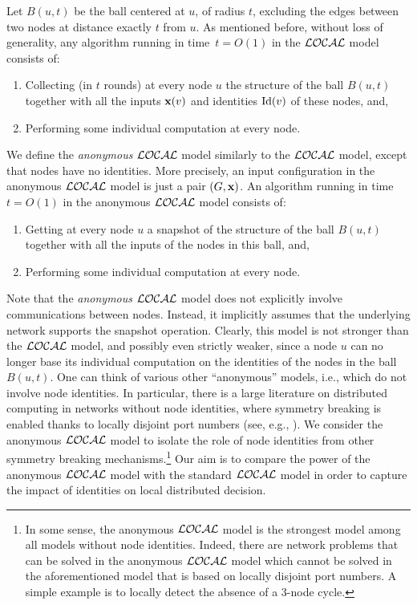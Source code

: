 \documentclass{llncs}
\newcommand{\local}{{\cal LOCAL}}
\newcommand{\inp}{\mbox{\rm\bf x}}
\newcommand{\id}{\mbox{\rm Id}}
\begin{document}
Let $B(u,t)$ be the ball centered at $u$, of radius $t$, excluding the edges between two nodes at distance exactly $t$ from $u$. As mentioned before, without loss of generality, any algorithm running in time~$t=O(1)$ in the $\local$ model consists of:
\begin{enumerate}
\item  Collecting (in $t$ rounds) at every node $u$ the structure of the ball $B(u,t)$  together with all the inputs $\inp(v)$ and identities $\id(v)$ of these nodes, and,
\item Performing some individual computation at every node. 
\end{enumerate}
We define the \emph{anonymous} $\local$  model similarly to the $\local$ model, except that nodes have no identities. More precisely, an input configuration in the anonymous $\local$ model is just a pair $(G,\inp)$. An algorithm running in time~$t=O(1)$ in the anonymous $\local$ model consists of:
\begin{enumerate}
\item Getting at every node $u$ a snapshot of the structure of the ball $B(u,t)$ together with all the inputs of the nodes in this ball, and,
\item Performing some individual computation at every node. 
\end{enumerate}
Note that the \emph{anonymous} $\local$ model does not explicitly involve communications between nodes. Instead, it implicitly assumes that the underlying network supports the snapshot operation.
Clearly, this model is not stronger than the $\local$  model, and possibly even strictly weaker, since a node $u$ can no longer base its individual computation on the identities of the nodes in the ball $B(u,t)$. One can think of various other ``anonymous'' models, i.e., which do not involve node identities. In particular, there is a large literature on distributed computing in networks without node identities, where symmetry breaking is enabled thanks to locally disjoint port numbers (see, e.g., \cite{FP11}). We consider the anonymous $\local$ model to isolate the role of node identities from other symmetry breaking mechanisms.\footnote{In some sense, the anonymous $\local$ model is the strongest model among all models without node identities. Indeed, there are network problems that can be solved in the  anonymous $\local$ model  which cannot be solved in the aforementioned model that is based on locally disjoint port numbers. A simple example is to locally detect the absence of a 3-node cycle.} Our aim is to compare the power of the anonymous $\local$ model with the standard $\local$ model in order to capture the impact of identities on local distributed decision. 
\end{document}
